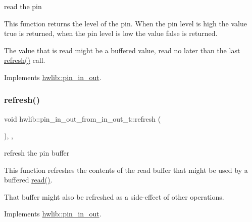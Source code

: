 read the pin

This function returns the level of the pin. When the pin level is high the value true is returned, when the pin level is low the value false is returned.

The value that is read might be a buffered value, read no later than the last \hyperlink{classhwlib_1_1pin__in__out__from__in__out__t_a837f2e06d599ef26730a1e05c997d334}{refresh()} call. 

Implements \hyperlink{classhwlib_1_1pin__in__out_a5caebc7ab9fe49b7e020b89f0a2cf892}{hwlib\+::pin\+\_\+in\+\_\+out}.

\mbox{\label{classhwlib_1_1pin__in__out__from__in__out__t_a837f2e06d599ef26730a1e05c997d334}} 
\subsubsection{\texorpdfstring{refresh()}{refresh()}}
{\footnotesize\ttfamily void hwlib\+::pin\+\_\+in\+\_\+out\+\_\+from\+\_\+in\+\_\+out\+\_\+t\+::refresh (\begin{DoxyParamCaption}{ }\end{DoxyParamCaption})\hspace{0.3cm}{\ttfamily [inline]}, {\ttfamily [override]}, {\ttfamily [virtual]}}

refresh the pin buffer

This function refreshes the contents of the read buffer that might be used by a buffered \hyperlink{classhwlib_1_1pin__in__out__from__in__out__t_ae1a321c11a2691bb6068e18835add2de}{read()}.

That buffer might also be refreshed as a side-\/effect of other operations. 

Implements \hyperlink{classhwlib_1_1pin__in__out_a8815baac4e5193ec68795956f5e363a6}{hwlib\+::pin\+\_\+in\+\_\+out}.

\mbox{\label{classhwlib_1_1pin__in__out__from__in__out__t_a20e982d8706e7a45e5d622c54602c87e}} 
